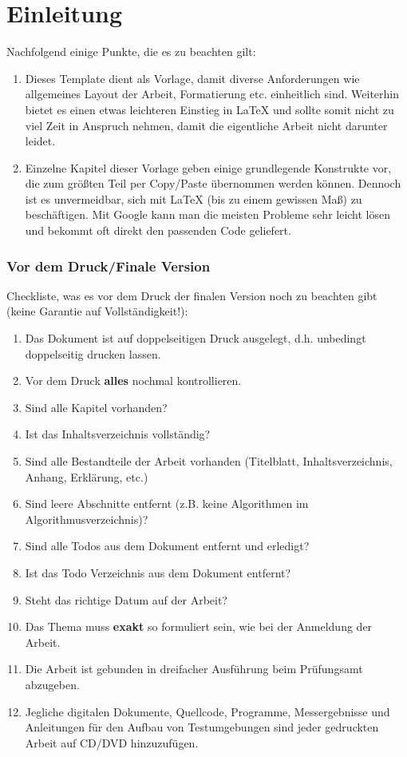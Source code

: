 \chapter{Einleitung}

Nachfolgend einige Punkte, die es zu beachten gilt:
\begin{enumerate}
 \item Dieses Template dient als Vorlage, damit diverse Anforderungen wie allgemeines Layout der Arbeit,
       Formatierung etc. einheitlich sind. Weiterhin bietet es einen etwas leichteren Einstieg in LaTeX
       und sollte somit nicht zu viel Zeit in Anspruch nehmen, damit die eigentliche Arbeit nicht darunter leidet.
 \item Einzelne Kapitel dieser Vorlage geben einige grundlegende Konstrukte vor, die zum größten Teil per
       Copy/Paste übernommen werden können. Dennoch ist es unvermeidbar, sich mit LaTeX (bis zu einem
       gewissen Maß) zu beschäftigen. Mit Google kann man die meisten Probleme sehr leicht lösen und
       bekommt oft direkt den passenden Code geliefert.
\end{enumerate}

\subsection{Vor dem Druck/Finale Version}

Checkliste, was es vor dem Druck der finalen Version noch zu beachten gibt (keine Garantie auf Vollständigkeit!):
\begin{enumerate}
 \item Das Dokument ist auf doppelseitigen Druck ausgelegt, d.h. unbedingt doppelseitig drucken lassen.
 \item Vor dem Druck \textbf{alles} nochmal kontrollieren.
 \item Sind alle Kapitel vorhanden?
 \item Ist das Inhaltsverzeichnis vollständig?
 \item Sind alle Bestandteile der Arbeit vorhanden (Titelblatt, Inhaltsverzeichnis, Anhang, Erklärung, etc.)
 \item Sind leere Abschnitte entfernt (z.B. keine Algorithmen im Algorithmusverzeichnis)?
 \item Sind alle Todos aus dem Dokument entfernt und erledigt? 
 \item Ist das Todo Verzeichnis aus dem Dokument entfernt?
 \item Steht das richtige Datum auf der Arbeit?
 \item Das Thema muss \textbf{exakt} so formuliert sein, wie bei der Anmeldung der Arbeit.
 \item Die Arbeit ist gebunden in dreifacher Ausführung beim Prüfungsamt abzugeben.
 \item Jegliche digitalen Dokumente, Quellcode, Programme, Messergebnisse und Anleitungen für den Aufbau von Testumgebungen 
 sind jeder gedruckten Arbeit auf CD/DVD hinzuzufügen.  
\end{enumerate}